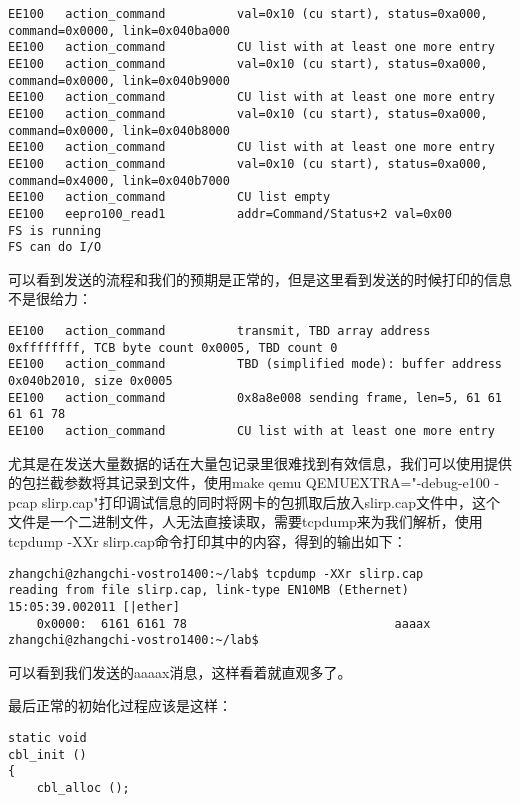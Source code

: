 \documentclass{article}
\begin{document}
\begin{CJK*}{UTF8}{gkai}
\begin{lstlisting}[style=console, basicstyle=\tiny\color{green}\ttfamily\bfseries]
EE100	action_command          val=0x10 (cu start), status=0xa000, command=0x0000, link=0x040ba000
EE100	action_command          CU list with at least one more entry
EE100	action_command          val=0x10 (cu start), status=0xa000, command=0x0000, link=0x040b9000
EE100	action_command          CU list with at least one more entry
EE100	action_command          val=0x10 (cu start), status=0xa000, command=0x0000, link=0x040b8000
EE100	action_command          CU list with at least one more entry
EE100	action_command          val=0x10 (cu start), status=0xa000, command=0x4000, link=0x040b7000
EE100	action_command          CU list empty
EE100	eepro100_read1          addr=Command/Status+2 val=0x00
FS is running
FS can do I/O
\end{lstlisting}

可以看到发送的流程和我们的预期是正常的，但是这里看到发送的时候打印的信息不是很给力：

\begin{lstlisting}[style=console, basicstyle=\tiny\color{green}\ttfamily\bfseries]
EE100	action_command          transmit, TBD array address 0xffffffff, TCB byte count 0x0005, TBD count 0
EE100	action_command          TBD (simplified mode): buffer address 0x040b2010, size 0x0005
EE100	action_command          0x8a8e008 sending frame, len=5, 61 61 61 61 78
EE100	action_command          CU list with at least one more entry
\end{lstlisting}


尤其是在发送大量数据的话在大量包记录里很难找到有效信息，我们可以使用提供的包拦截参数将其记录到文件，使用make qemu QEMUEXTRA="-debug-e100 -pcap slirp.cap"打印调试信息的同时将网卡的包抓取后放入slirp.cap文件中，这个文件是一个二进制文件，人无法直接读取，需要tcpdump来为我们解析，使用tcpdump -XXr slirp.cap命令打印其中的内容，得到的输出如下：

\vspace{1em}

\begin{lstlisting}[style=console]
zhangchi@zhangchi-vostro1400:~/lab$ tcpdump -XXr slirp.cap 
reading from file slirp.cap, link-type EN10MB (Ethernet)
15:05:39.002011 [|ether]
	0x0000:  6161 6161 78                             aaaax
zhangchi@zhangchi-vostro1400:~/lab$ 
\end{lstlisting}

可以看到我们发送的aaaax消息，这样看着就直观多了。

最后正常的初始化过程应该是这样：

\begin{lstlisting}[style=ccode, title={\scriptsize \ttfamily \bfseries kern/e100.c: cbl\_init()}]
static void
cbl_init () 
{
    cbl_alloc ();


\end{lstlisting}
\end{CJK*}
\end{document}
